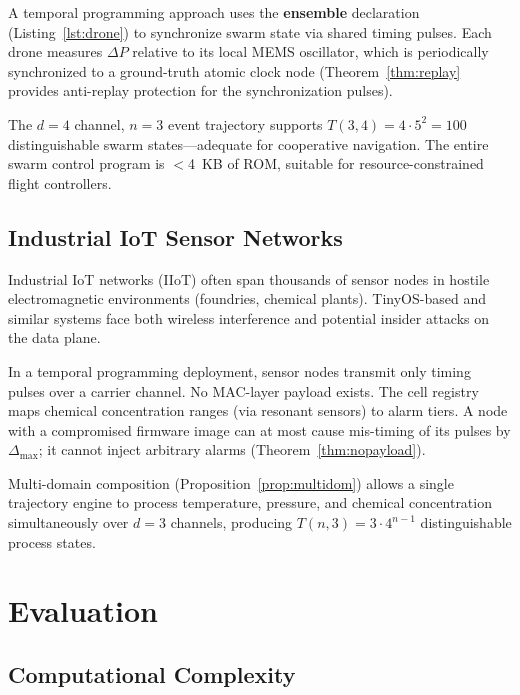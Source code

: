 \documentclass[twocolumn,10pt]{article}
\newcommand{\DP}{\Delta P}          %
\begin{document}
A temporal programming approach uses the \textbf{ensemble}
declaration (Listing~\ref{lst:drone}) to synchronize swarm state
via shared timing pulses. Each drone measures $\DP$ relative to its
local MEMS oscillator, which is periodically synchronized to a
ground-truth atomic clock node (Theorem~\ref{thm:replay} provides
anti-replay protection for the synchronization pulses).

The $d=4$ channel, $n=3$ event trajectory supports
$T(3,4) = 4 \cdot 5^2 = 100$ distinguishable swarm states---adequate
for cooperative navigation. The entire swarm control program is
$<$4~KB of ROM, suitable for resource-constrained flight controllers.

\subsection{Industrial IoT Sensor Networks}

Industrial IoT networks (IIoT) often span thousands of sensor nodes
in hostile electromagnetic environments (foundries, chemical plants).
TinyOS-based \cite{levis2005tinyos} and similar systems face both
wireless interference and potential insider attacks on the data plane.

In a temporal programming deployment, sensor nodes transmit only
timing pulses over a carrier channel. No MAC-layer payload exists.
The cell registry maps chemical concentration ranges (via resonant
sensors) to alarm tiers. A node with a compromised firmware image
can at most cause mis-timing of its pulses by $\Delta_{\max}$;
it cannot inject arbitrary alarms (Theorem~\ref{thm:nopayload}).

Multi-domain composition (Proposition~\ref{prop:multidom}) allows a
single trajectory engine to process temperature, pressure, and
chemical concentration simultaneously over $d=3$ channels, producing
$T(n,3) = 3 \cdot 4^{n-1}$ distinguishable process states.

\section{Evaluation}
\label{sec:eval}

\subsection{Computational Complexity}
\end{document}
